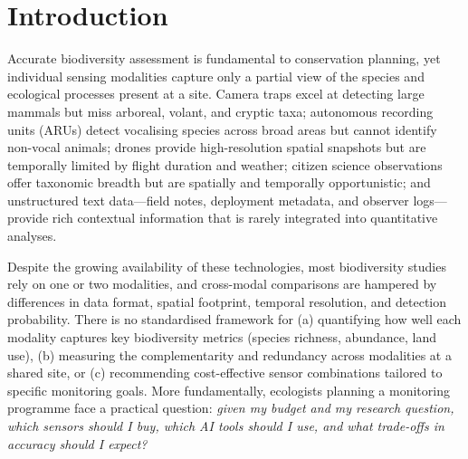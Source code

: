 \documentclass[12pt]{article}
\begin{document}

\section{Introduction}

Accurate biodiversity assessment is fundamental to conservation planning, yet individual sensing modalities capture only a partial view of the species and ecological processes present at a site. Camera traps excel at detecting large mammals but miss arboreal, volant, and cryptic taxa; autonomous recording units (ARUs) detect vocalising species across broad areas but cannot identify non-vocal animals; drones provide high-resolution spatial snapshots but are temporally limited by flight duration and weather; citizen science observations offer taxonomic breadth but are spatially and temporally opportunistic; and unstructured text data---field notes, deployment metadata, and observer logs---provide rich contextual information that is rarely integrated into quantitative analyses.

Despite the growing availability of these technologies, most biodiversity studies rely on one or two modalities, and cross-modal comparisons are hampered by differences in data format, spatial footprint, temporal resolution, and detection probability. There is no standardised framework for (a) quantifying how well each modality captures key biodiversity metrics (species richness, abundance, land use), (b) measuring the complementarity and redundancy across modalities at a shared site, or (c) recommending cost-effective sensor combinations tailored to specific monitoring goals. More fundamentally, ecologists planning a monitoring programme face a practical question: \textit{given my budget and my research question, which sensors should I buy, which AI tools should I use, and what trade-offs in accuracy should I expect?}
\end{document}
